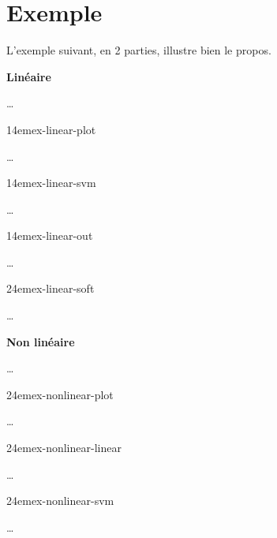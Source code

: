 \section{Exemple}

L’exemple suivant, en 2 parties, illustre bien le propos.

\textbf{Linéaire} \cite{ex-linear}

…

{14em}{ex-linear-plot}

…

{14em}{ex-linear-svm}

…

{14em}{ex-linear-out}

…

{24em}{ex-linear-soft}

…

\pagebreak

\textbf{Non linéaire} \cite{ex-nonlinear}

…

{24em}{ex-nonlinear-plot}

…

{24em}{ex-nonlinear-linear}

…

{24em}{ex-nonlinear-svm}

…

\pagebreak
